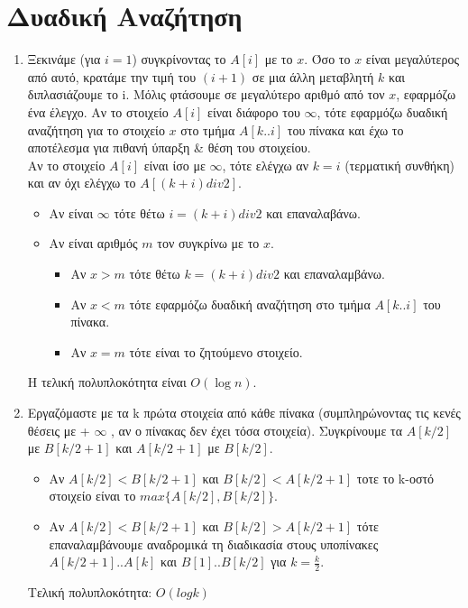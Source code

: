 \documentclass[a4paper,10pt]{article} \usepackage{anysize}
\begin{document}
\section{Δυαδική Αναζήτηση}
\begin{enumerate}
\item Ξεκινάμε (για $i=1$) συγκρίνοντας το $A[i]$ με το $x$. Όσο το $x$ είναι
μεγαλύτερος από αυτό, κρατάμε την τιμή του $(i+1)$ σε μια άλλη μεταβλητή $k$ και
διπλασιάζουμε το i.
Μόλις φτάσουμε σε μεγαλύτερο αριθμό από τον $x$, εφαρμόζω ένα έλεγχο.
Αν το στοιχείο $A[i]$ είναι διάφορο του $\infty$, τότε εφαρμόζω δυαδική αναζήτηση
για το στοιχείο $x$ στο τμήμα $Α[k..i]$ του πίνακα και έχω το αποτέλεσμα για
πιθανή ύπαρξη \& θέση του στοιχείου. \\
Αν το στοιχείο $A[i]$ είναι ίσο με $\infty$, τότε ελέγχω αν $k=i$ (τερματική
συνθήκη) και αν όχι ελέγχω το $A[(k+i) div 2]$.
\begin{itemize}
\item Αν είναι $\infty$ τότε θέτω $i= (k+i)div 2$ και επαναλαβάνω.
\item Αν είναι αριθμός $m$ τον συγκρίνω με το $x$.
\begin{itemize}
\item Αν $x>m$ τότε θέτω $k= (k+i) div 2$ και επαναλαμβάνω.
\item Αν $x<m$ τότε εφαρμόζω δυαδική αναζήτηση στο τμήμα $A[k..i]$ του
πίνακα.
\item Αν $x=m$ τότε είναι το ζητούμενο στοιχείο.
\end{itemize}
\end{itemize}

Η τελική πολυπλοκότητα είναι $O(\log{n})$.\\

\item Εργαζόμαστε με τα k πρώτα στοιχεία από κάθε πίνακα (συμπληρώνοντας τις
κενές θέσεις με + $\infty$ , αν ο πίνακας δεν έχει τόσα στοιχεία). Συγκρίνουμε τα
$A[k/2]$ με $B[k/2+1]$ και $A[k/2+1]$ με $B[k/2]$.
\begin{itemize}
\item Αν $A[k/2]<B[k/2+1]$ και $B[k/2]<A[k/2+1]$ τοτε το k-οστό στοιχείο είναι το
$max\{A[k/2],B[k/2]\}$.
\item Αν $A[k/2]<B[k/2+1]$ και $B[k/2]>A[k/2+1]$ τότε επαναλαμβάνουμε αναδρομικά
τη διαδικασία στους υποπίνακες $A[k/2+1]..A[k]$ και $B[1]..B[k/2]$ για $k = \frac
{k}{2}$.
\end{itemize}

Τελική πολυπλοκότητα: $O(log{k})$
\end{enumerate}
\end{document}
